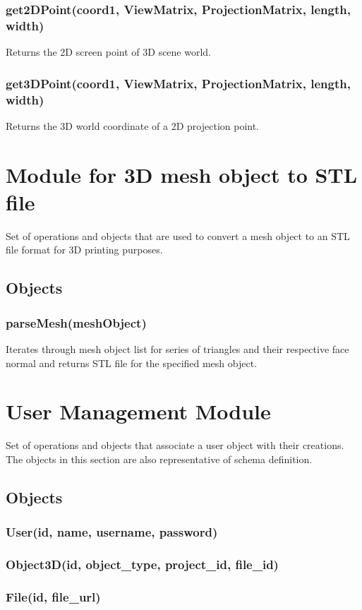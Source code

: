 \documentclass{report}
\begin{document}
\subsubsection{get2DPoint(coord1, ViewMatrix, ProjectionMatrix, length, width)}
Returns the 2D screen point of 3D scene world.
\subsubsection{get3DPoint(coord1, ViewMatrix, ProjectionMatrix, length, width)}
Returns the 3D world coordinate of a 2D projection point.

\section{Module for 3D mesh object to STL file}
Set of operations and objects that are used to convert a mesh object to an STL file format for 3D printing purposes.
\subsection{Objects}
\subsubsection{parseMesh(meshObject)}
Iterates through mesh object list for series of triangles and their respective face normal and returns STL file for the specified mesh object.

\section{User Management Module}
Set of operations and objects that associate a user object with their creations.  The objects in this section are also representative of schema definition.
\subsection{Objects}
\subsubsection{User(id, name, username, password)}
\subsubsection{Object3D(id, object\_type, project\_id, file\_id)}
\subsubsection{File(id, file\_url)}
\end{document}
